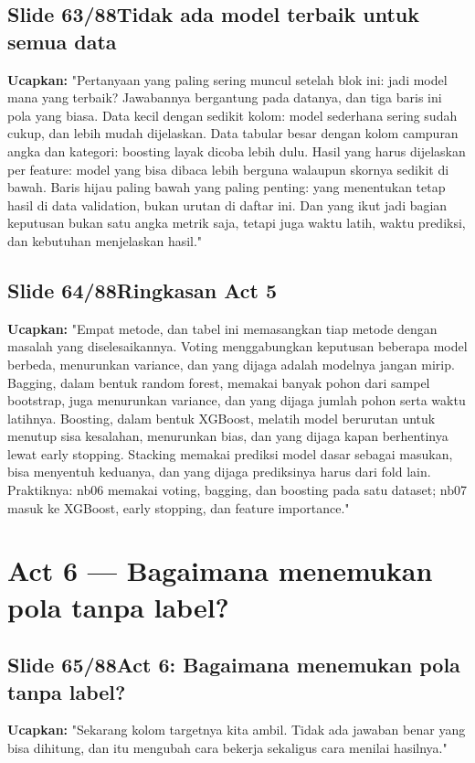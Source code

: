 \documentclass[11pt]{article}
\renewcommand{\framebox}[1]{\colorbox{acc!15}{\textcolor{acc}{\textbf{#1}}}}
\begin{document}
\subsection*{\framebox{Slide 63/88}\quad Tidak ada model terbaik untuk semua data}
\textbf{Ucapkan:} "Pertanyaan yang paling sering muncul setelah blok ini: jadi model mana yang terbaik? Jawabannya bergantung pada datanya, dan tiga baris ini pola yang biasa. Data kecil dengan sedikit kolom: model sederhana sering sudah cukup, dan lebih mudah dijelaskan. Data tabular besar dengan kolom campuran angka dan kategori: boosting layak dicoba lebih dulu. Hasil yang harus dijelaskan per feature: model yang bisa dibaca lebih berguna walaupun skornya sedikit di bawah. Baris hijau paling bawah yang paling penting: yang menentukan tetap hasil di data validation, bukan urutan di daftar ini. Dan yang ikut jadi bagian keputusan bukan satu angka metrik saja, tetapi juga waktu latih, waktu prediksi, dan kebutuhan menjelaskan hasil."\\[2pt]

\subsection*{\framebox{Slide 64/88}\quad Ringkasan Act 5}
\textbf{Ucapkan:} "Empat metode, dan tabel ini memasangkan tiap metode dengan masalah yang diselesaikannya. Voting menggabungkan keputusan beberapa model berbeda, menurunkan variance, dan yang dijaga adalah modelnya jangan mirip. Bagging, dalam bentuk random forest, memakai banyak pohon dari sampel bootstrap, juga menurunkan variance, dan yang dijaga jumlah pohon serta waktu latihnya. Boosting, dalam bentuk XGBoost, melatih model berurutan untuk menutup sisa kesalahan, menurunkan bias, dan yang dijaga kapan berhentinya lewat early stopping. Stacking memakai prediksi model dasar sebagai masukan, bisa menyentuh keduanya, dan yang dijaga prediksinya harus dari fold lain. Praktiknya: nb06 memakai voting, bagging, dan boosting pada satu dataset; nb07 masuk ke XGBoost, early stopping, dan feature importance."\\[2pt]

\section{Act 6 — Bagaimana menemukan pola tanpa label?}

\subsection*{\framebox{Slide 65/88}\quad Act 6: Bagaimana menemukan pola tanpa label?}
\textbf{Ucapkan:} "Sekarang kolom targetnya kita ambil. Tidak ada jawaban benar yang bisa dihitung, dan itu mengubah cara bekerja sekaligus cara menilai hasilnya."\\[2pt]
\end{document}
